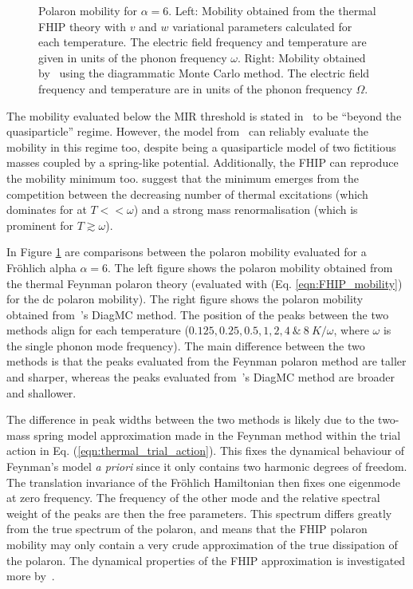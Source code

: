 \begin{figure}[t]
{\begin{subfigure}[b]{.6\textwidth}
\end{subfigure}%
}
\caption{Polaron mobility for $\alpha = 6$. Left: Mobility obtained from the thermal FHIP theory with $v$ and $w$ variational parameters calculated for each temperature. The electric field frequency and temperature are given in units of the phonon frequency $\omega$. Right: Mobility obtained by~\cite{mishchenko_polaron_2019} using the diagrammatic Monte Carlo method. The electric field frequency and temperature are in units of the phonon frequency $\Omega$.}
\label{fig:mishchenko}
\end{figure}

The mobility evaluated below the MIR threshold is stated in~\cite{mishchenko_polaron_2019} to be ``beyond the quasiparticle'' regime. However, the model from~\cite{feynman_mobility_1962} can reliably evaluate the mobility in this regime too, despite being a quasiparticle model of two fictitious masses coupled by a spring-like potential. Additionally, the FHIP can reproduce the mobility minimum too. \cite{mishchenko_polaron_2019} suggest that the minimum emerges from the competition between the decreasing number of thermal excitations (which dominates for at $T << \omega$) and a strong mass renormalisation (which is prominent for $T \gtrsim \omega$). 

In Figure \ref{fig:mishchenko} are comparisons between the polaron mobility evaluated for a Fr\"ohlich alpha $\alpha = 6$. The left figure shows the polaron mobility obtained from the thermal Feynman polaron theory (evaluated with (Eq. \ref{eqn:FHIP_mobility}) for the dc polaron mobility). The right figure shows the polaron mobility obtained from~\cite{mishchenko_polaron_2019}'s DiagMC method. The position of the peaks between the two methods align for each temperature ($0.125, 0.25, 0.5, 1, 2, 4\  \&\ 8\ K/\omega$, where $\omega$ is the single phonon mode frequency). The main difference between the two methods is that the peaks evaluated from the Feynman polaron method are taller and sharper, whereas the peaks evaluated from~\cite{mishchenko_polaron_2019}'s DiagMC method are broader and shallower. 

The difference in peak widths between the two methods is likely due to the two-mass spring model approximation made in the Feynman method within the trial action in Eq. (\ref{eqn:thermal_trial_action}). This fixes the dynamical behaviour of Feynman's model \emph{a priori} since it only contains two harmonic degrees of freedom. The translation invariance of the Fr\"ohlich Hamiltonian then fixes one eigenmode at zero frequency. The frequency of the other mode and the relative spectral weight of the peaks are then the free parameters. This spectrum differs greatly from the true spectrum of the polaron, and means that the FHIP polaron mobility may only contain a very crude approximation of the true dissipation of the polaron. The dynamical properties of the FHIP approximation is investigated more by~\cite{sels_dynamic_2016}.

